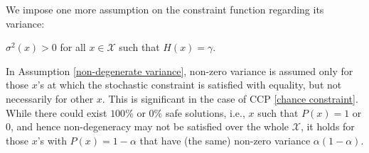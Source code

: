 \documentclass[mnsc,blindrev]{informs4} %
\newcommand{\abs}[1]{\left \vert #1 \right\vert}
\begin{document}
We impose one more assumption on the constraint function regarding its variance:
\begin{assumption}\label{non-degenerate variance}
$\sigma^2(x)>0$ for all $x\in\mathcal X$ such that $H(x)=\gamma$.
\end{assumption}
In Assumption \ref{non-degenerate variance}, non-zero variance is assumed only for those $x$'s at which the stochastic constraint is satisfied with equality, but not necessarily for other $x$. This is significant in the case of CCP \eqref{chance constraint}. While there could exist $100\%$ or $0\%$ safe solutions, i.e., $x$ such that $P(x)=1$ or $0$, and hence non-degeneracy may not be satisfied over the whole $\mathcal X$, it holds for those $x$'s with $P(x)=1-\alpha$ that have (the same) non-zero variance $\alpha(1-\alpha)$.




\end{document}
